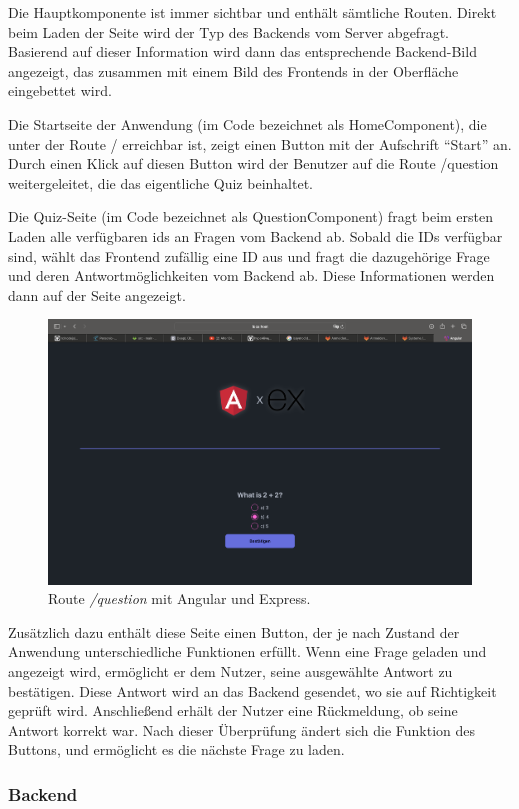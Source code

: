 \documentclass[biblatex]{lni}
\begin{document}
Die Hauptkomponente ist immer sichtbar und enthält sämtliche Routen.
Direkt beim Laden der Seite wird der Typ des Backends vom Server abgefragt.
Basierend auf dieser Information wird dann das entsprechende Backend-Bild angezeigt,
das zusammen mit einem Bild des Frontends in der Oberfläche eingebettet wird.

Die Startseite der Anwendung (im Code bezeichnet als HomeComponent),
die unter der Route / erreichbar ist, zeigt einen Button mit der Aufschrift “Start” an.
Durch einen Klick auf diesen Button wird der Benutzer auf die Route /question weitergeleitet,
die das eigentliche Quiz beinhaltet.

Die Quiz-Seite (im Code bezeichnet als QuestionComponent) fragt beim ersten Laden alle verfügbaren ids an Fragen vom Backend ab.
Sobald die IDs verfügbar sind,
wählt das Frontend zufällig eine ID aus und fragt die dazugehörige Frage und deren Antwortmöglichkeiten vom Backend ab.
Diese Informationen werden dann auf der Seite angezeigt.

\begin{figure}
  \centering
  \includegraphics[width=.8\textwidth]{question-component}
  \caption{Route \textit{/question} mit Angular und Express.}
  \label{fig:question-component}
\end{figure}

Zusätzlich dazu enthält diese Seite einen Button,
der je nach Zustand der Anwendung unterschiedliche Funktionen erfüllt.
Wenn eine Frage geladen und angezeigt wird, ermöglicht er dem Nutzer,
seine ausgewählte Antwort zu bestätigen.
Diese Antwort wird an das Backend gesendet, wo sie auf Richtigkeit geprüft wird.
Anschließend erhält der Nutzer eine Rückmeldung, ob seine Antwort korrekt war.
Nach dieser Überprüfung ändert sich die Funktion des Buttons, und ermöglicht es die nächste Frage zu laden.

\subsubsection{Backend}
\end{document}
